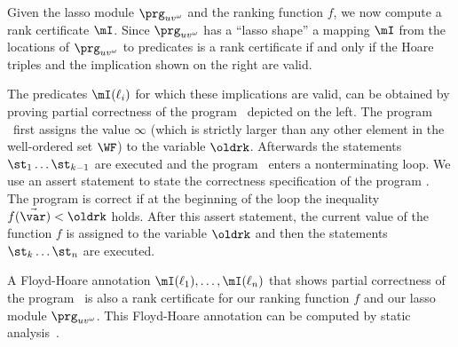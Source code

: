 Given the lasso module $\prg_{uv^\omega}$ and the ranking function $f$, we now compute a rank certificate $\mI$.
Since $\prg_{uv^\omega}$ has a ``lasso shape'' a mapping $\mI$ from the locations of $\prg_{uv^\omega}$ to predicates is a rank certificate if and only if the Hoare triples and the implication shown on the right are valid.



The predicates  $\mI(\ell_i)$ for which these implications are valid, can be obtained by proving partial correctness of the program \rankDecrease\ depicted on the left.
The program \rankDecrease\ first assigns the value $\infty$ (which is strictly larger than any other element in the well-ordered set $\WF$) to the variable $\oldrk$.
Afterwards the statements $\st_1\dots\st_{k-1}$ are executed and the program \rankDecrease\ enters a nonterminating  loop.
We use an assert statement to state the correctness specification of the program \rankDecrease.
The program is correct if at the beginning of the  loop the inequality $f(\vec\var)<\oldrk$ holds.
After this assert statement, the current value of the function $f$ is assigned to the variable $\oldrk$ and then the statements $\st_{k}\dots\st_n$ are executed.

A Floyd-Hoare annotation $\mI(\ell_1),\dots,\mI(\ell_n)$ that shows partial correctness of the program \rankDecrease\ is also a rank certificate for our ranking function $f$ and our lasso module $\prg_{uv^\omega}$. 
This Floyd-Hoare annotation can be computed by static analysis~\cite{popl/CousotC77}.


